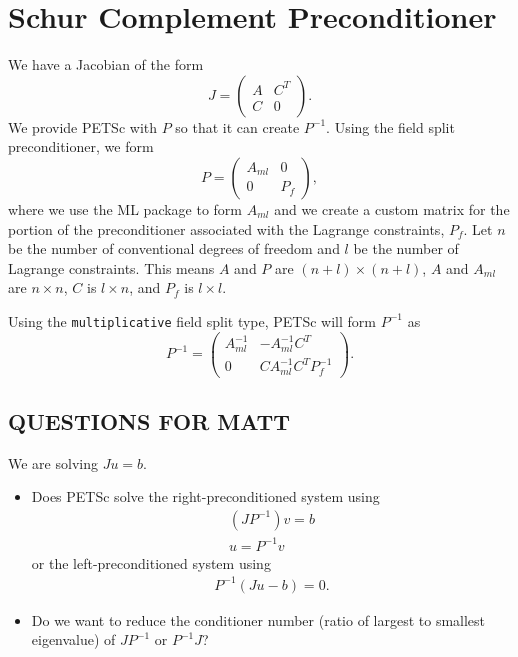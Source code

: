 \documentclass{article}[10pt]
\begin{document}
\section{Schur Complement Preconditioner}

We have a Jacobian of the form
\begin{equation}
  J = \left( \begin{array}{cc}
    A & C^T \\
    C & 0
  \end{array} \right).
\end{equation}
We provide PETSc with $P$ so that it can create $P^{-1}$. Using the
field split preconditioner, we form
\begin{equation}
  P = \left( \begin{array}{cc}
    A_\mathit{ml} & 0 \\
    0 & P_f
  \end{array} \right),
\end{equation}
where we use the ML package to form $A_\mathit{ml}$ and we create a
custom matrix for the portion of the preconditioner associated with
the Lagrange constraints, $P_f$. Let $n$ be the number of conventional
degrees of freedom and $l$ be the number of Lagrange constraints. This
means $A$ and $P$ are $(n+l) \times (n+l)$, $A$ and $A_\mathit{ml}$
are $n \times n$, $C$ is $l \times n$, and $P_f$ is $l \times l$.

Using the {\tt multiplicative} field split type, PETSc will form
$P^{-1}$ as
\begin{equation}
  P^{-1} = \left( \begin{array}{cc}
    A_\mathit{ml}^{-1} & -A_\mathit{ml}^{-1} C^T \\
    0 & C A_\mathit{ml}^{-1} C^T P_f^{-1}
  \end{array} \right).
\end{equation}

\subsection*{QUESTIONS FOR MATT}
We are solving $J u = b$.
\begin{itemize}
\item Does PETSc solve the right-preconditioned system using
  \begin{gather}
    (J P^{-1}) v = b \\
    u = P^{-1} v
  \end{gather}
  or the left-preconditioned system using
  \begin{gather}
    P^{-1}(J u - b) = 0.
  \end{gather}
\item
  Do we want to reduce the conditioner number (ratio of largest to
  smallest eigenvalue) of $J P^{-1}$ or $P^{-1} J$?
\end{itemize}
      
\end{document}

